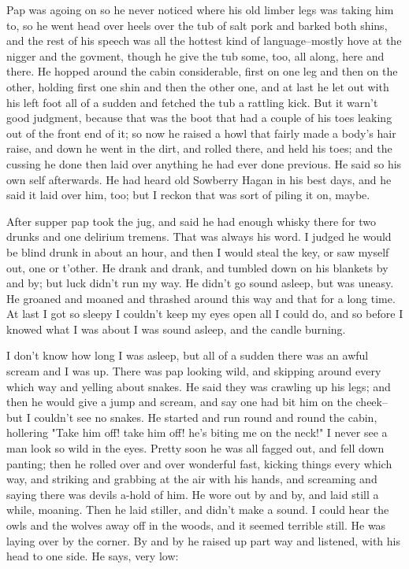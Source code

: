 Pap was agoing on so he never noticed where his old limber legs was
taking him to, so he went head over heels over the tub of salt pork and
barked both shins, and the rest of his speech was all the hottest kind of
language--mostly hove at the nigger and the govment, though he give the
tub some, too, all along, here and there.  He hopped around the cabin
considerable, first on one leg and then on the other, holding first one
shin and then the other one, and at last he let out with his left foot
all of a sudden and fetched the tub a rattling kick.  But it warn't good
judgment, because that was the boot that had a couple of his toes leaking
out of the front end of it; so now he raised a howl that fairly made a
body's hair raise, and down he went in the dirt, and rolled there, and
held his toes; and the cussing he done then laid over anything he had
ever done previous.  He said so his own self afterwards.  He had heard
old Sowberry Hagan in his best days, and he said it laid over him, too;
but I reckon that was sort of piling it on, maybe.

After supper pap took the jug, and said he had enough whisky there for
two drunks and one delirium tremens.  That was always his word.  I judged
he would be blind drunk in about an hour, and then I would steal the key,
or saw myself out, one or t'other.  He drank and drank, and tumbled down
on his blankets by and by; but luck didn't run my way.  He didn't go
sound asleep, but was uneasy.  He groaned and moaned and thrashed around
this way and that for a long time.  At last I got so sleepy I couldn't
keep my eyes open all I could do, and so before I knowed what I was about
I was sound asleep, and the candle burning.

I don't know how long I was asleep, but all of a sudden there was an
awful scream and I was up.  There was pap looking wild, and skipping
around every which way and yelling about snakes.  He said they was
crawling up his legs; and then he would give a jump and scream, and say
one had bit him on the cheek--but I couldn't see no snakes.  He started
and run round and round the cabin, hollering "Take him off! take him off!
he's biting me on the neck!"  I never see a man look so wild in the eyes.
Pretty soon he was all fagged out, and fell down panting; then he rolled
over and over wonderful fast, kicking things every which way, and
striking and grabbing at the air with his hands, and screaming and saying
there was devils a-hold of him.  He wore out by and by, and laid still a
while, moaning.  Then he laid stiller, and didn't make a sound.  I could
hear the owls and the wolves away off in the woods, and it seemed
terrible still.  He was laying over by the corner. By and by he raised up
part way and listened, with his head to one side.  He says, very low:


